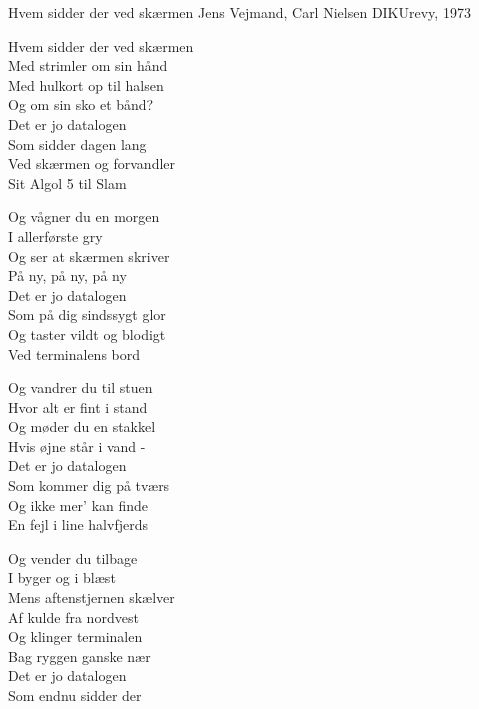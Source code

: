 \begin{song}{Hvem sidder der ved skærmen}
  {} %
  {Jens Vejmand, Carl Nielsen} %
  {} %
  {DIKUrevy, 1973} %
  {\NotCCLIed} %

  \begin{SBVerse}
    Hvem sidder der ved skærmen\\
    Med strimler om sin hånd\\
    Med hulkort op til halsen\\
    Og om sin sko et bånd?\\
    \medskip
    Det er jo datalogen\\
    Som sidder dagen lang\\
    Ved skærmen og forvandler\\
    Sit Algol 5 til Slam
  \end{SBVerse}

  \begin{SBVerse}
    Og vågner du en morgen\\
    I allerførste gry\\
    Og ser at skærmen skriver\\
    På ny, på ny, på ny\\
    \medskip
    Det er jo datalogen\\
    Som på dig sindssygt glor\\
    Og taster vildt og blodigt\\
    Ved terminalens bord
  \end{SBVerse}

  \begin{SBVerse}
    Og vandrer du til stuen\\
    Hvor alt er fint i stand\\
    Og møder du en stakkel\\
    Hvis øjne står i vand -\\
    \medskip
    Det er jo datalogen\\
    Som kommer dig på tværs\\
    Og ikke mer' kan finde\\
    En fejl i line halvfjerds
  \end{SBVerse}

  \begin{SBVerse}
    Og vender du tilbage\\
    I byger og i blæst\\
    Mens aftenstjernen skælver\\
    Af kulde fra nordvest\\
    \medskip
    Og klinger terminalen\\
    Bag ryggen ganske nær\\
    Det er jo datalogen\\
    Som endnu sidder der
  \end{SBVerse}


\end{song}
